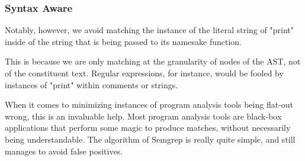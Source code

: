 \documentclass[aspectratio=169, handout]{beamer}
\begin{document}
\begin{frame}[fragile]
  \frametitle{Syntax Aware}

  Notably, however, we avoid matching the instance of the literal string
  of "print" inside of the string that is being passed to its namesake function.

  \pause
  \vspace{\fill}

  This is because we are only matching at the granularity of nodes of the AST,
  not of the constituent text. Regular expressions, for instance, would be fooled
  by instances of "print" within comments or strings.

  \pause
  \vspace{\fill}

  When it comes to minimizing instances of program analysis tools being flat-out
  wrong, this is an invaluable help. Most program analysis tools are black-box
  applications that perform some magic to produce matches, without necessarily
  being understandable. The algorithm of Semgrep is really quite simple, and
  still manages to avoid false positives.
\end{frame}
\end{document}
